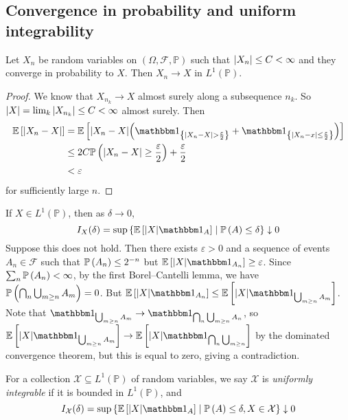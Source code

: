 \subsection{Convergence in probability and uniform integrability}
\begin{theorem}
	Let \( X_n \) be random variables on \( (\Omega, \mathcal F, \mathbb P) \) such that \( \abs{X_n} \leq C < \infty \) and they converge in probability to \( X \).
	Then \( X_n \to X \) in \( L^1(\mathbb P) \).
\end{theorem}
\begin{proof}
	We know that \( X_{n_k} \to X \) almost surely along a subsequence \( n_k \).
	So \( \abs{X} = \lim_k \abs{X_{n_k}} \leq C < \infty \) almost surely.
	Then
	\begin{align*}
		\expect{\abs{X_n - X}} &= \expect{\abs{X_n - X} \qty(\mathbbm 1_{\qty{\abs{X_n - X} > \frac \varepsilon 2}} + \mathbbm 1_{\qty{\abs{X_n - x} \leq \frac \varepsilon 2}})} \\
		&\leq 2 C \prob{\abs{X_n - X} \geq \frac{\varepsilon}{2}} + \frac \varepsilon 2 \\
		&< \varepsilon
	\end{align*}
	for sufficiently large \( n \).
\end{proof}
If \( X \in L^1(\mathbb P) \), then as \( \delta \to 0 \),
\[ I_X(\delta) = \sup \qty{ \expect{\abs{X} \mathbbm 1_A} \mid \prob{A} \leq \delta} \downarrow 0 \]
Suppose this does not hold.
Then there exists \( \varepsilon > 0 \) and a sequence of events \( A_n \in \mathcal F \) such that \( \mathbb{P}\left({A_n}\right) \leq 2^{-n} \) but \( \expect{\abs{X} \mathbbm 1_{A_n}} \geq \varepsilon \).
Since \( \sum_n \mathbb{P}\left({A_n}\right) < \infty \), by the first Borel--Cantelli lemma, we have \( \mathbb{P}\left({\bigcap_n \bigcup_{m \geq n} A_m}\right) = 0 \).
But \( \expect{\abs{X} \mathbbm 1_{A_n}} \leq \expect{\abs{X} \mathbbm 1_{\bigcup_{m \geq n} A_m}} \).
Note that \( \mathbbm 1_{\bigcup_{m \geq n} A_m} \to \mathbbm 1_{\bigcap_n \bigcup_{m \geq n} A_n} \), so \( \expect{\abs{X} \mathbbm 1_{\bigcup_{m \geq n} A_m}} \to \expect{\abs{X} \mathbbm 1_{\bigcap_n \bigcup_{m \geq n}}} \) by the dominated convergence theorem, but this is equal to zero, giving a contradiction.
\begin{definition}
	For a collection \( \mathcal X \subseteq L^1(\mathbb P) \) of random variables, we say \( \mathcal X \) is \emph{uniformly integrable} if it is bounded in \( L^1(\mathbb P) \), and
	\[ I_{\mathcal X}(\delta) = \sup \qty{ \expect{\abs{X}\mathbbm 1_A} \mid \prob{A} \leq \delta, X \in \mathcal X} \downarrow 0 \]
\end{definition}
